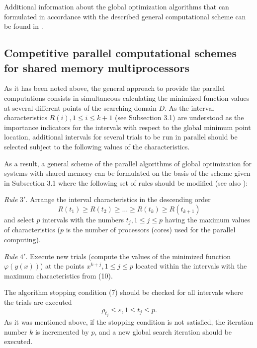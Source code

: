 \documentclass[12pt]{amsart}
\begin{document}
Additional information about the global optimization algorithms that can formulated in accordance with the described general computational scheme can be found in \cite{Strongin1, Strongin2}.


\subsection{Competitive parallel computational schemes for shared memory multiprocessors}

As it has been noted above, the general approach to provide the parallel computations consists in simultaneous calculating the minimized function values at several different points of the searching domain $D$. As the interval characteristics $R(i), 1 \leq i \leq k + 1$ (see Subsection 3.1) are understood as the importance indicators for the intervals with respect to the global minimum point location, additional intervals for several trials to be run in parallel should be selected subject to the following values of the characteristics.

As a result, a general scheme of the parallel algorithms of global optimization for systems with shared memory can be formulated on the basis of the scheme given in Subsection 3.1 where the following set of rules should be modified (see also \cite{Strongin1, Strongin2, Strongin4, Grishagin2}):

\textit{Rule} $3'$. Arrange the interval characteristics in the descending order
\begin{equation}
R(t_1) \geq R(t_2) \geq \dots \geq R(t_k) \geq R(t_{k+1})
\end{equation}
and select $p$ intervals with the numbers $t_j, 1 \leq j \leq p$ having the maximum values of characteristics ($p$ is the number of processors (cores) used for the parallel computing).

\textit{Rule} $4'$. Execute new trials (compute the values of the minimized function $\varphi(y(x))$) at the points $x^{k+j}, 1 \leq j \leq p$ located within the intervals with the maximum characteristics from (10).

The algorithm stopping condition (7) should be checked for all intervals where the trials are executed
\begin{equation}
\rho_{t_j} \leq \varepsilon, 1 \leq t_j \leq p.
\end{equation}
As it was mentioned above, if the stopping condition is not satisfied, the iteration number $k$ is incremented by $p$, and a new global search iteration should be executed.
\end{document}
